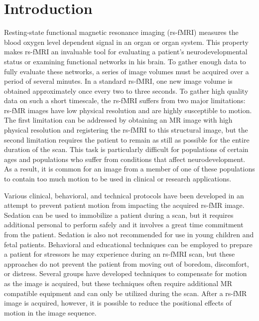 \chapter{Introduction}
\label{ch:intro}


Resting-state functional magnetic resonance imaging (rs-fMRI) measures the blood oxygen level dependent signal in an organ or organ system. This property makes rs-fMRI an invaluable tool for evaluating a patient's neurodevelopmental status or examining functional networks in his brain. To gather enough data to fully evaluate these networks, a series of image volumes must be acquired over a period of several minutes. In a standard rs-fMRI, one new image volume is obtained approximately once every two to three seconds. To gather high quality data on such a short timescale, the rs-fMRI suffers from two major limitations: rs-fMR images have low physical resolution and are highly susceptible to motion. The first limitation can be addressed by obtaining an MR image with high physical resolution and registering the rs-fMRI to this structural image, but the second limitation requires the patient to remain as still as possible for the entire duration of the scan. This task is particularly difficult for populations of certain ages and populations who suffer from conditions that affect neurodevelopment. As a result, it is common for an image from a member of one of these populations to contain too much motion to be used in clinical or research applications.

Various clinical, behavioral, and technical protocols have been developed in an attempt to prevent patient motion from impacting the acquired rs-fMR image. Sedation can be used to immobilize a patient during a scan, but it requires additional personal to perform safely and it involves a great time commitment from the patient. Sedation is also not recommended for use in young children and fetal patients. Behavioral and educational techniques can be employed to prepare a patient for stressors he may experience during an rs-fMRI scan, but these approaches do not prevent the patient from moving out of boredom, discomfort, or distress. Several groups have developed techniques to compensate for motion as the image is acquired, but these techniques often require additional MR compatible equipment and can only be utilized during the scan. After a rs-fMR image is acquired, however, it is possible to reduce the positional effects of motion in the image sequence.

